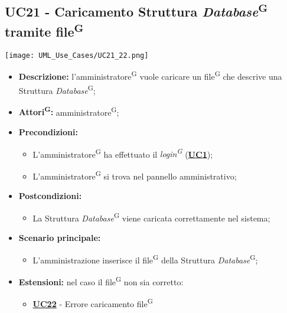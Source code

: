 \subsection{UC21 - Caricamento Struttura \textit{Database}\textsuperscript{G} tramite file\textsuperscript{G}}
\label{sec:UC21}
\texttt{[image: UML\_Use\_Cases/UC21\_22.png]}
\begin{itemize}
	\item \textbf{Descrizione:} l’amministratore\textsuperscript{G} vuole caricare un file\textsuperscript{G} che descrive una Struttura \textit{Database}\textsuperscript{G};
	\item \textbf{Attori\textsuperscript{G}:} amministratore\textsuperscript{G};
	\item \textbf{Precondizioni:} 
	\begin{itemize}
		\item L’amministratore\textsuperscript{G} ha effettuato il \textit{login\textsuperscript{G}} (\hyperref[sec:UC1]{\textbf{UC1}});
		\item L’amministratore\textsuperscript{G} si trova nel pannello amministrativo;
	\end{itemize}
	\item \textbf{Postcondizioni:} 
	\begin{itemize}
		\item La Struttura \textit{Database}\textsuperscript{G} viene caricata correttamente nel sistema;
	\end{itemize}
	\item \textbf{Scenario principale:} 
	\begin{itemize}
		\item L'amministrazione inserisce il file\textsuperscript{G} della Struttura \textit{Database}\textsuperscript{G};
	\end{itemize}
	\item \textbf{Estensioni:} nel caso il file\textsuperscript{G} non sia corretto:
	\begin{itemize}
		\item \hyperref[sec:UC22]{\textbf{UC22}} - Errore caricamento file\textsuperscript{G}
	\end{itemize}
\end{itemize}

